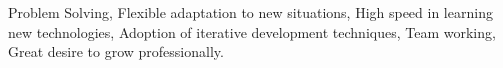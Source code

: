 



\scriptsize
Problem Solving, Flexible adaptation to new situations, High speed in learning new technologies, Adoption of iterative development techniques, Team working, Great desire to grow professionally.

\begin{cventries}







\end{cventries}